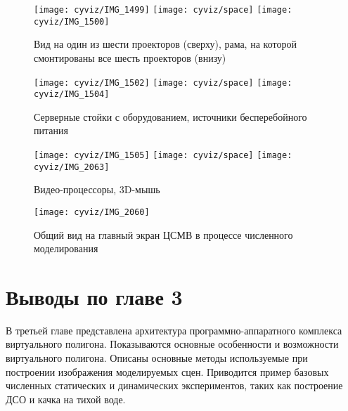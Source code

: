 \begin{figure}
\begin{center}
	\texttt{[image: cyviz/IMG\_1499]}
	\texttt{[image: cyviz/space]}
	\texttt{[image: cyviz/IMG\_1500]}
	\caption{Вид на один из шести проекторов (сверху), 
	рама, на которой смонтированы все шесть проекторов (внизу)}
\end{center}
\end{figure}

\begin{figure}
\begin{center}
	\texttt{[image: cyviz/IMG\_1502]}
	\texttt{[image: cyviz/space]}
	\texttt{[image: cyviz/IMG\_1504]}
	\caption{Серверные стойки с оборудованием, источники бесперебойного питания}
\end{center}
\end{figure}


\begin{figure}
\begin{center}
	\texttt{[image: cyviz/IMG\_1505]}
	\texttt{[image: cyviz/space]}
	\texttt{[image: cyviz/IMG\_2063]}
	\caption{Видео-процессоры, 3D-мышь}
\end{center}
\end{figure}

\begin{sidewaysfigure}
	\texttt{[image: cyviz/IMG\_2060]}
	\caption{Общий вид на главный экран ЦСМВ в процессе численного моделирования}
\end{sidewaysfigure}



\section{Выводы по главе 3}

В третьей главе представлена архитектура программно-аппаратного комплекса виртуального полигона.
Показываются основные особенности и возможности виртуального полигона. Описаны основные методы используемые при построении изображения 
моделируемых сцен.
Приводится пример базовых численных статических и динамических экспериментов, таких как построение ДСО и качка на тихой воде.
